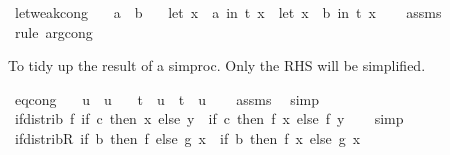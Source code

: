 \begin{isabellebody}
\isamarkupfalse%
\ let{\isacharunderscore}{\kern0pt}weak{\isacharunderscore}{\kern0pt}cong{\isacharcolon}{\kern0pt}\isanewline
\ \ \ {\isachardoublequoteopen}a\ {\isacharequal}{\kern0pt}\ b{\isachardoublequoteclose}\isanewline
\ \ \ {\isachardoublequoteopen}{\isacharparenleft}{\kern0pt}let\ x\ {\isacharequal}{\kern0pt}\ a\ in\ t\ x{\isacharparenright}{\kern0pt}\ {\isacharequal}{\kern0pt}\ {\isacharparenleft}{\kern0pt}let\ x\ {\isacharequal}{\kern0pt}\ b\ in\ t\ x{\isacharparenright}{\kern0pt}{\isachardoublequoteclose}\isanewline
%
\isadelimproof
\ \ %
\endisadelimproof
%
\isatagproof
{}\isamarkupfalse%
\ assms\ \isamarkupfalse%
\ {\isacharparenleft}{\kern0pt}rule\ arg{\isacharunderscore}{\kern0pt}cong{\isacharparenright}{\kern0pt}%
\endisatagproof
{\isafoldproof}%
%
\isadelimproof
%
\endisadelimproof
%
\begin{isamarkuptext}%
To tidy up the result of a simproc.  Only the RHS will be simplified.%
\end{isamarkuptext}\isamarkuptrue%
\isamarkupfalse%
\ eq{\isacharunderscore}{\kern0pt}cong{}{\isacharcolon}{\kern0pt}\isanewline
\ \ \ {\isachardoublequoteopen}u\ {\isacharequal}{\kern0pt}\ u{\isacharprime}{\kern0pt}{\isachardoublequoteclose}\isanewline
\ \ \ {\isachardoublequoteopen}{\isacharparenleft}{\kern0pt}t\ {\isasymequiv}\ u{\isacharparenright}{\kern0pt}\ {\isasymequiv}\ {\isacharparenleft}{\kern0pt}t\ {\isasymequiv}\ u{\isacharprime}{\kern0pt}{\isacharparenright}{\kern0pt}{\isachardoublequoteclose}\isanewline
%
\isadelimproof
\ \ %
\endisadelimproof
%
\isatagproof
{}\isamarkupfalse%
\ assms\ \isamarkupfalse%
\ simp%
\endisatagproof
{\isafoldproof}%
%
\isadelimproof
\isanewline
%
\endisadelimproof
\isanewline
{}\isamarkupfalse%
\ if{\isacharunderscore}{\kern0pt}distrib{\isacharcolon}{\kern0pt}\ {\isachardoublequoteopen}f\ {\isacharparenleft}{\kern0pt}if\ c\ then\ x\ else\ y{\isacharparenright}{\kern0pt}\ {\isacharequal}{\kern0pt}\ {\isacharparenleft}{\kern0pt}if\ c\ then\ f\ x\ else\ f\ y{\isacharparenright}{\kern0pt}{\isachardoublequoteclose}\isanewline
%
\isadelimproof
\ \ %
\endisadelimproof
%
\isatagproof
{}\isamarkupfalse%
\ simp%
\endisatagproof
{\isafoldproof}%
%
\isadelimproof
\isanewline
%
\endisadelimproof
\isanewline
{}\isamarkupfalse%
\ if{\isacharunderscore}{\kern0pt}distribR{\isacharcolon}{\kern0pt}\ {\isachardoublequoteopen}{\isacharparenleft}{\kern0pt}if\ b\ then\ f\ else\ g{\isacharparenright}{\kern0pt}\ x\ {\isacharequal}{\kern0pt}\ {\isacharparenleft}{\kern0pt}if\ b\ then\ f\ x\ else\ g\ x{\isacharparenright}{\kern0pt}{\isachardoublequoteclose}\isanewline

\end{isabellebody}
